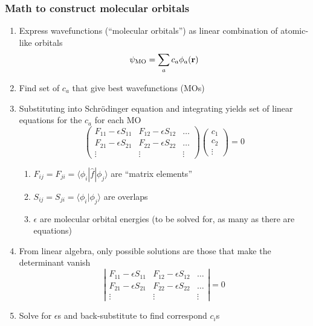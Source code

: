 \documentclass[11pt]{article}
\begin{document}
\subsubsection{Math to construct molecular orbitals}
\label{sec:org5da7958}
\begin{enumerate}
\item Express wavefunctions (``molecular orbitals'') as linear combination of atomic-like orbitals
\begin{equation}
  \psi_\mathrm{MO}=\sum_a c_a\phi_a({\bf r})
\end{equation}
\item Find set of \(c_a\) that give best wavefunctions (MOs)
\item Substituting into Schr\"{o}dinger equation and integrating yields set of linear equations for the \(c_a\) for each MO
	\begin{displaymath}
    \left ( \begin{array}{ccc}
      F_{11}-\epsilon S_{11} & F_{12}-\epsilon S_{12} & \ldots \\
      F_{21}-\epsilon S_{21} & F_{22}-\epsilon S_{22} & \ldots \\
      \vdots & \vdots & \vdots
    \end{array} \right ) \left (
    \begin{array}{c}
      c_1 \\
      c_2 \\
      \vdots
    \end{array} \right ) = 0
\end{displaymath}
\begin{enumerate}
\item \(F_{ij} = F_{ji} = \langle \phi_i | \hat f | \phi_j \rangle\) are
``matrix elements''
\item \(S_{ij} = S_{ji} = \langle \phi_i | \phi_j \rangle\) are overlaps
\item \(\epsilon\) are molecular orbital energies (to be solved for, as many as there are equations)
\end{enumerate}
\item From linear algebra, only possible solutions are those that make the determinant vanish
	\begin{displaymath}
    \left | \begin{array}{ccc}
      F_{11}-\epsilon S_{11} & F_{12}-\epsilon S_{12} & \ldots \\
      F_{21}-\epsilon S_{21} & F_{22}-\epsilon S_{22} & \ldots \\
      \vdots & \vdots & \vdots
    \end{array} \right | = 0
\end{displaymath}
\item Solve for \(\epsilon\)s and back-substitute to find correspond \(c_i\)s
\end{enumerate}
\end{document}
